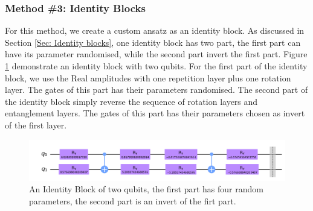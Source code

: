 \subsubsection{Method \#3: Identity Blocks}
For this method, we create a custom ansatz as an identity block.
As discussed in Section \ref{Sec: Identity blocks}, one identity block has two part, the first part can have its parameter randomised, while the second part invert the first part.
Figure \ref{Fig: Identity Ansatz Sample} demonstrate an identity block with two qubits.
For the first part of the identity block, we use the Real amplitudes with one repetition layer plus one rotation layer.
The gates of this part has their parameters randomised.
The second part of the identity block simply reverse the sequence of rotation layers and entanglement layers.
The gates of this part has their parameters chosen as invert of the first layer.
\begin{figure}
    \centering
    \includegraphics[width=\textwidth]{Artefact/Appendices/ansatz-identity.png}
    \caption{An Identity Block of two qubits, the first part has four random parameters, the second part is an invert of the firt part.}
    \label{Fig: Identity Ansatz Sample}
\end{figure}
